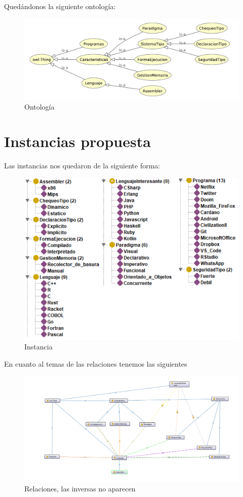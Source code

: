 \documentclass[12pt, titlepage, a4paper]{article}
\begin{document}
\noindent Quedándonos la siguiente ontología:
\begin{figure}[H]
    \centering
    \includegraphics[width=.8\textwidth]{Imagenes/Ontologia.png}
    \caption{Ontología}
\end{figure}

\section{Instancias propuesta}
Las instancias nos quedaron de la siguiente forma:
\begin{figure}[H]
    \centering
    \includegraphics[width=.5\textwidth]{Imagenes/Instancias3.png}
    \caption{Instancia}
\end{figure}

En cuanto al temas de las relaciones tenemos las siguientes
\begin{figure}[H]
    \centering
    \includegraphics[width=.8\textwidth]{Imagenes/Relaciones3.png}
    \caption{Relaciones, las inversas no aparecen}
\end{figure}
\end{document}
